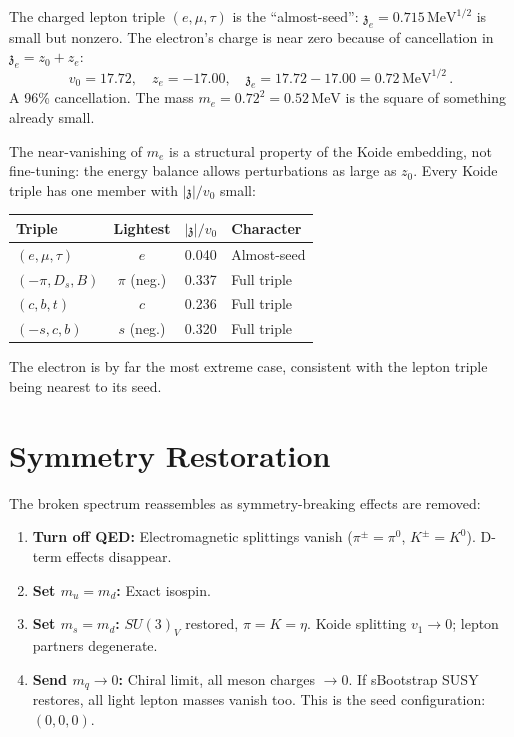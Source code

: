\documentclass[12pt,a4paper]{article}
\newcommand{\MeV}{\,\text{MeV}}
\newcommand{\zch}{\mathfrak{z}}
\begin{document}
The charged lepton triple $(e, \mu, \tau)$ is the ``almost-seed'': 
$\zch_e = 0.715\MeV^{1/2}$ is small but nonzero. The electron's 
charge is near zero because of cancellation in $\zch_e = z_0 + z_e$:
\begin{equation}
v_0 = 17.72, \quad z_e = -17.00, \quad 
\zch_e = 17.72 - 17.00 = 0.72\MeV^{1/2}\,.
\end{equation}
A 96\% cancellation. The mass $m_e = 0.72^2 = 0.52\MeV$ is the 
square of something already small.

The near-vanishing of $m_e$ is a structural property of the Koide 
embedding, not fine-tuning: the energy balance allows perturbations 
as large as $z_0$. Every Koide triple has one member with 
$|\zch|/v_0$ small:

\begin{center}
\begin{tabular}{lccl}
\toprule
Triple & Lightest & $|\zch|/v_0$ & Character \\
\midrule
$(e, \mu, \tau)$ & $e$ & 0.040 & Almost-seed \\
$(-\pi, D_s, B)$ & $\pi$ (neg.) & 0.337 & Full triple \\
$(c, b, t)$ & $c$ & 0.236 & Full triple \\
$(-s, c, b)$ & $s$ (neg.) & 0.320 & Full triple \\
\bottomrule
\end{tabular}
\end{center}

The electron is by far the most extreme case, consistent with the 
lepton triple being nearest to its seed.

\section{Symmetry Restoration}
\label{sec:restoration}

The broken spectrum reassembles as symmetry-breaking effects are 
removed:

\begin{enumerate}
\item \textbf{Turn off QED:} Electromagnetic splittings vanish 
($\pi^\pm = \pi^0$, $K^\pm = K^0$). D-term effects disappear.
\item \textbf{Set $m_u = m_d$:} Exact isospin.
\item \textbf{Set $m_s = m_d$:} $SU(3)_V$ restored, 
$\pi = K = \eta$. Koide splitting $v_1 \to 0$; lepton partners 
degenerate.
\item \textbf{Send $m_q \to 0$:} Chiral limit, all meson charges 
$\to 0$. If sBootstrap SUSY restores, all light lepton masses 
vanish too. This is the seed configuration: $(0, 0, 0)$.
\end{enumerate}
\end{document}
